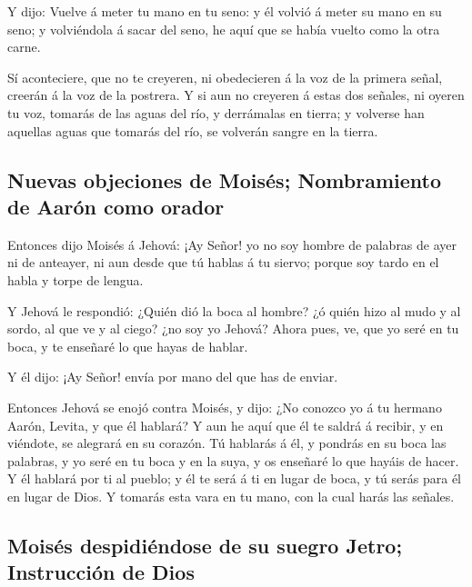  Y dijo: Vuelve á meter tu mano en tu seno: y él volvió á
meter su mano en su seno; y volviéndola á sacar del seno, he aquí que se
había vuelto como la otra carne.

 Sí aconteciere, que no te creyeren, ni obedecieren á la
voz de la primera señal, creerán á la voz de la postrera. 
Y si aun no creyeren á estas dos señales, ni oyeren tu voz, tomarás de
las aguas del río, y derrámalas en tierra; y volverse han aquellas aguas
que tomarás del río, se volverán sangre en la tierra.

\hypertarget{nuevas-objeciones-de-moisuxe9s-nombramiento-de-aaruxf3n-como-orador}{%
\subsection{Nuevas objeciones de Moisés; Nombramiento de Aarón como
orador}\label{nuevas-objeciones-de-moisuxe9s-nombramiento-de-aaruxf3n-como-orador}}

 Entonces dijo Moisés á Jehová: ¡Ay Señor! yo no soy
hombre de palabras de ayer ni de anteayer, ni aun desde que tú hablas á
tu siervo; porque soy tardo en el habla y torpe de lengua.

 Y Jehová le respondió: ¿Quién dió la boca al hombre? ¿ó
quién hizo al mudo y al sordo, al que ve y al ciego? ¿no soy yo Jehová?
 Ahora pues, ve, que yo seré en tu boca, y te enseñaré lo
que hayas de hablar.

 Y él dijo: ¡Ay Señor! envía por mano del que has de
enviar.

 Entonces Jehová se enojó contra Moisés, y dijo: ¿No
conozco yo á tu hermano Aarón, Levita, y que él hablará? Y aun he aquí
que él te saldrá á recibir, y en viéndote, se alegrará en su corazón.
 Tú hablarás á él, y pondrás en su boca las palabras, y
yo seré en tu boca y en la suya, y os enseñaré lo que hayáis de hacer.
 Y él hablará por ti al pueblo; y él te será á ti en
lugar de boca, y tú serás para él en lugar de Dios.  Y
tomarás esta vara en tu mano, con la cual harás las señales.

\hypertarget{moisuxe9s-despidiuxe9ndose-de-su-suegro-jetro-instrucciuxf3n-de-dios}{%
\subsection{Moisés despidiéndose de su suegro Jetro; Instrucción de
Dios}\label{moisuxe9s-despidiuxe9ndose-de-su-suegro-jetro-instrucciuxf3n-de-dios}}

